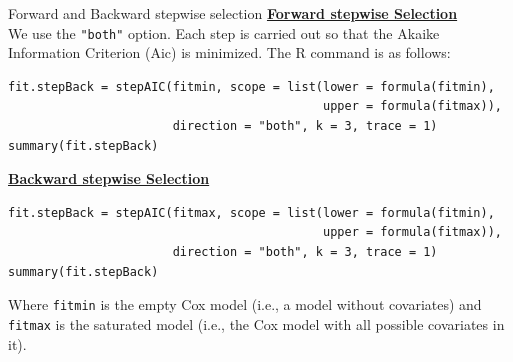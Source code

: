 \documentclass[envcountsect, 10pt, portrait, palatino]{beamer}
\begin{document}
\begin{frame}[fragile]{Forward and Backward stepwise selection}
\underline{\bf Forward stepwise Selection}
\\[2ex]
We use the {\tt "both"} option. Each step is carried out so that the Akaike Information Criterion (Aic) is minimized.  The R command is as follows:

\small
\begin{verbatim}
fit.stepBack = stepAIC(fitmin, scope = list(lower = formula(fitmin),
                                            upper = formula(fitmax)),
                       direction = "both", k = 3, trace = 1)
summary(fit.stepBack)
\end{verbatim}
\normalsize
\underline{\bf Backward stepwise Selection}
\\[2ex]
\small
\begin{verbatim}
fit.stepBack = stepAIC(fitmax, scope = list(lower = formula(fitmin),
                                            upper = formula(fitmax)),
                       direction = "both", k = 3, trace = 1)
summary(fit.stepBack)
\end{verbatim}
\normalsize
Where {\tt fitmin} is the empty Cox model (i.e., a model without covariates) and {\tt fitmax} is the saturated model (i.e., the Cox model with all possible covariates in it).
\end{frame}
\end{document}
